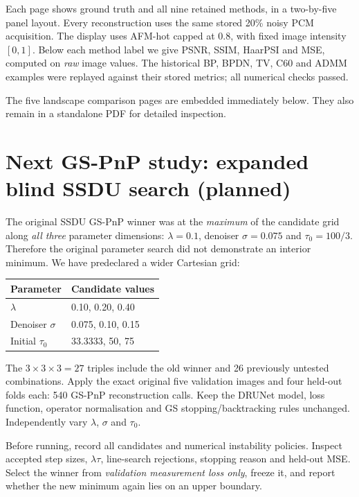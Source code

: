 \documentclass[a4paper,10pt]{article}
\begin{document}
Each page shows ground truth and all nine retained methods, in a
two-by-five panel layout. Every reconstruction uses the same stored
20\% noisy PCM acquisition. The display uses AFM-hot capped at 0.8,
with fixed image intensity $[0,1]$. Below each method label we give
PSNR, SSIM, HaarPSI and MSE, computed on \emph{raw} image values.
The historical BP, BPDN, TV, C60 and ADMM examples were replayed
against their stored metrics; all numerical checks passed.

The five landscape comparison pages are embedded immediately below.
They also remain in a standalone PDF for detailed inspection.

\clearpage


\section*{Next GS-PnP study: expanded blind SSDU search (planned)}

The original SSDU GS-PnP winner was at the \emph{maximum} of the
candidate grid along \emph{all three} parameter dimensions:
$\lambda=0.1$, denoiser $\sigma=0.075$ and $\tau_0=100/3$.
Therefore the original parameter search did not demonstrate an
interior minimum. We have predeclared a wider Cartesian grid:

\begin{center}
\begin{tabular}{@{}lp{100mm}@{}}
\toprule
\textbf{Parameter}&\textbf{Candidate values}\\
\midrule
$\lambda$&0.10, 0.20, 0.40\\
Denoiser $\sigma$&0.075, 0.10, 0.15\\
Initial $\tau_0$&33.3333, 50, 75\\
\bottomrule
\end{tabular}
\end{center}

The $3\times3\times3=27$ triples include the old winner and 26
previously untested combinations. Apply the exact original five
validation images and four held-out folds each: 540 GS-PnP
reconstruction calls. Keep the DRUNet model, loss function, operator
normalisation and GS stopping/backtracking rules unchanged.
Independently vary $\lambda$, $\sigma$ and $\tau_0$.

Before running, record all candidates and numerical instability
policies. Inspect accepted step sizes, $\lambda\tau$, line-search
rejections, stopping reason and held-out MSE. Select the winner from
\emph{validation measurement loss only}, freeze it, and report whether
the new minimum again lies on an upper boundary.
\end{document}
